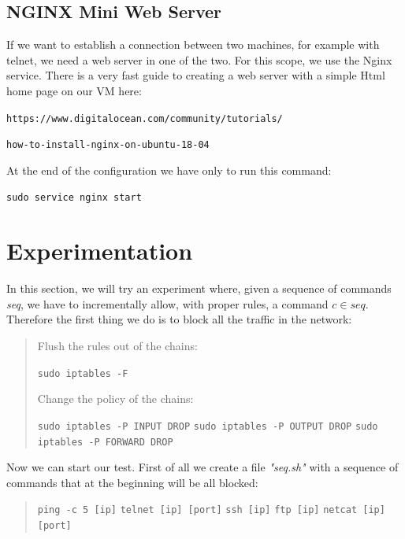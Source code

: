 \documentclass[11pt]{article}
\begin{document}
\subsection{NGINX Mini Web Server}
If we want to establish a connection between two machines, for example with telnet, we need a web server in one of the two. For this scope, we use the Nginx service. There is a very fast guide to creating a web server with a simple Html home page on our VM here:

\verb|https://www.digitalocean.com/community/tutorials/|

\verb|how-to-install-nginx-on-ubuntu-18-04|

\bigskip
At the end of the configuration we have only to run this command:

\texttt{sudo service nginx start}

\section{Experimentation}
In this section, we will try an experiment where, given a sequence of commands {\em seq}, we have to incrementally allow, with proper rules, a command $c \in seq$. Therefore the first thing we do is to block all the traffic in the network:

\begin{quote}
 Flush the rules out of the chains:

 \texttt{sudo iptables -F}\newline

 Change the policy of the chains:

 \texttt{sudo iptables -P INPUT DROP}\newline
 \texttt{sudo iptables -P OUTPUT DROP}\newline
 \texttt{sudo iptables -P FORWARD DROP}\newline
\end{quote}

Now we can start our test. First of all we create a file {\em "seq.sh"} with a sequence of commands that at the beginning will be all blocked:

\begin{quote}
 \texttt{ping -c 5 [ip]}\newline
 \texttt{telnet [ip] [port]}\newline
 \texttt{ssh [ip]}\newline
 \texttt{ftp [ip]}\newline
 \texttt{netcat [ip] [port]}
\end{quote}
\end{document}
